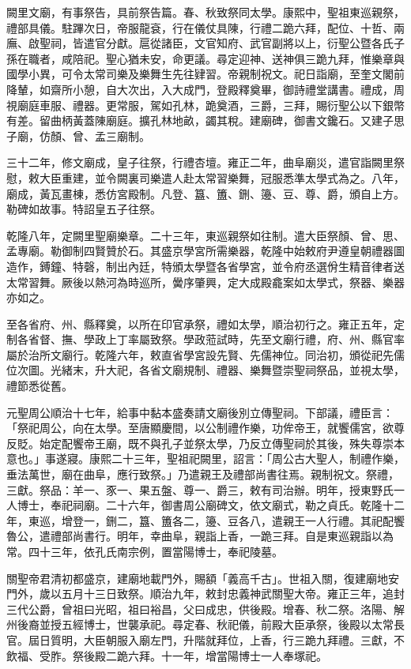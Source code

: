\begin{pinyinscope}
闕里文廟，有事祭告，具前祭告篇。春、秋致祭同太學。康熙中，聖祖東巡親祭，禮部具儀。駐蹕次日，帝服龍袞，行在儀仗具陳，行禮二跪六拜，配位、十哲、兩廡、啟聖祠，皆遣官分獻。扈從諸臣，文官知府、武官副將以上，衍聖公暨各氏子孫在職者，咸陪祀。聖心猶未安，命更議。尋定迎神、送神俱三跪九拜，惟樂章與國學小異，可令太常司樂及樂舞生先往肄習。帝親制祝文。祀日詣廟，至奎文閣前降輦，如齋所小憩，自大次出，入大成門，登殿釋奠畢，御詩禮堂講書。禮成，周視廟庭車服、禮器。更常服，駕如孔林，跪奠酒，三爵，三拜，賜衍聖公以下銀幣有差。留曲柄黃蓋陳廟庭。擴孔林地畝，蠲其稅。建廟碑，御書文鑱石。又建子思子廟，仿顏、曾、孟三廟制。

三十二年，修文廟成，皇子往祭，行禮杏壇。雍正二年，曲阜廟災，遣官詣闕里祭慰，敕大臣重建，並令闕裏司樂遣人赴太常習樂舞，冠服悉準太學式為之。八年，廟成，黃瓦畫棟，悉仿宮殿制。凡登、簋、簠、鉶、籩、豆、尊、爵，頒自上方。勒碑如故事。特詔皇五子往祭。

乾隆八年，定闕里聖廟樂章。二十三年，東巡親祭如往制。遣大臣祭顏、曾、思、孟專廟。勒御制四賢贊於石。其盛京學宮所需樂器，乾隆中始敕府尹遵皇朝禮器圖造作，鎛鐘、特磬，制出內廷，特頒太學暨各省學宮，並令府丞選佾生精音律者送太常習舞。厥後以熱河為時巡所，黌序肇興，定大成殿龕案如太學式，祭器、樂器亦如之。

至各省府、州、縣釋奠，以所在印官承祭，禮如太學，順治初行之。雍正五年，定制各省督、撫、學政上丁率屬致祭。學政蒞試時，先至文廟行禮，府、州、縣官率屬於治所文廟行。乾隆六年，敕直省學宮設先賢、先儒神位。同治初，頒從祀先儒位次圖。光緒末，升大祀，各省文廟規制、禮器、樂舞暨崇聖祠祭品，並視太學，禮節悉從舊。

元聖周公順治十七年，給事中黏本盛奏請文廟後別立傳聖祠。下部議，禮臣言：「祭祀周公，向在太學。至唐顯慶間，以公制禮作樂，功侔帝王，就饗儒宮，欲尊反貶。始定配饗帝王廟，既不與孔子並祭太學，乃反立傳聖祠於其後，殊失尊崇本意也。」事遂寢。康熙二十三年，聖祖祀闕里，詔言：「周公古大聖人，制禮作樂，垂法萬世，廟在曲阜，應行致祭。」乃遣親王及禮部尚書往焉。親制祝文。祭禮，三獻。祭品：羊一、豕一、果五盤、尊一、爵三，敕有司治辦。明年，授東野氏一人博士，奉祀祠廟。二十六年，御書周公廟碑文，依文廟式，勒之貞氏。乾隆十二年，東巡，增登一，鉶二，簋、簠各二，籩、豆各八，遣親王一人行禮。其祀配饗魯公，遣禮部尚書行。明年，幸曲阜，親詣上香，一跪三拜。自是東巡親詣以為常。四十三年，依孔氏南宗例，置當陽博士，奉祀陵墓。

關聖帝君清初都盛京，建廟地載門外，賜額「義高千古」。世祖入關，復建廟地安門外，歲以五月十三日致祭。順治九年，敕封忠義神武關聖大帝。雍正三年，追封三代公爵，曾祖曰光昭，祖曰裕昌，父曰成忠，供後殿。增春、秋二祭。洛陽、解州後裔並授五經博士，世襲承祀。尋定春、秋祀儀，前殿大臣承祭，後殿以太常長官。屆日質明，大臣朝服入廟左門，升階就拜位，上香，行三跪九拜禮。三獻，不飲福、受胙。祭後殿二跪六拜。十一年，增當陽博士一人奉塚祀。


\end{pinyinscope}
